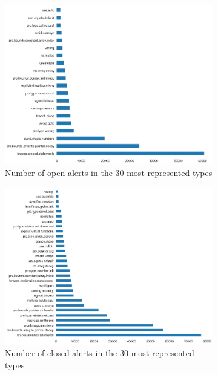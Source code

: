  \begin{figure}[H]
	\begin{subfigure}{0.5\textwidth}
 		\centering
 		\includegraphics[scale=0.2]{./src/data_analysis/closed_types_barh.jpg}
 		\caption{Number of open alerts in the 30 most represented types}\label{}
 	\end{subfigure}%
 	\begin{subfigure}{0.5\textwidth}
 		\centering
 		\includegraphics[scale=0.2]{./src/data_analysis/open_type_barh.jpg}
 		\caption{Number of closed alerts in the 30 most represented types}\label{}
 	\end{subfigure}
	\begin{subfigure}{0.5\textwidth}

\end{subfigure}
\end{figure}
